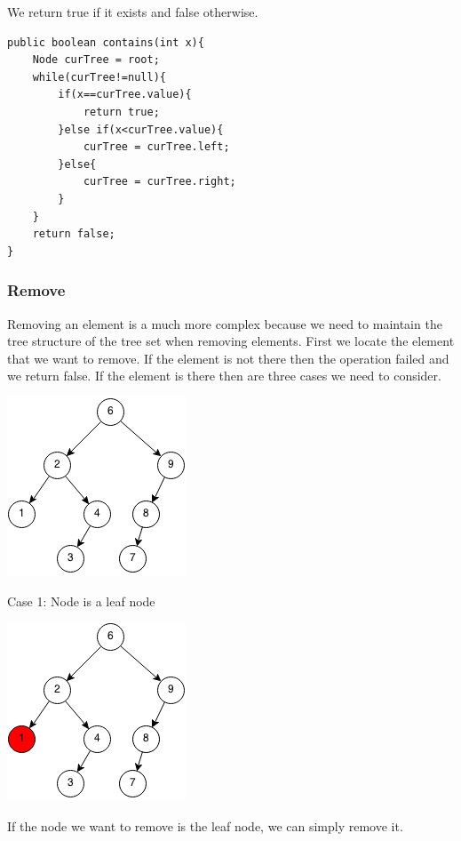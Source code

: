 \documentclass[11pt,oneside]{book}
\makeatletter
\def\maxwidth#1{\ifdim\Gin@nat@width>#1 #1\else\Gin@nat@width\fi}
\makeatother
\begin{document}
We return true if it exists and false otherwise.

\begin{lstlisting}
public boolean contains(int x){
    Node curTree = root;
    while(curTree!=null){
        if(x==curTree.value){
            return true;
        }else if(x<curTree.value){
            curTree = curTree.left;
        }else{
            curTree = curTree.right;
        }
    }
    return false;
}
\end{lstlisting}

\subsubsection{Remove}

Removing an element is a much more complex because we need to maintain the tree structure of the tree set when removing elements. First we locate the element that we want to remove. If the element is not there then the operation failed and we return false. If the element is there then are three cases we need to consider.

\vspace{5px}\includegraphics[width=\maxwidth{\textwidth}]{bst-rem.png}

Case 1: Node is a leaf node

\vspace{5px}\includegraphics[width=\maxwidth{\textwidth}]{bst-rem-case11.png}

If the node we want to remove is the leaf node, we can simply remove it.
\end{document}
